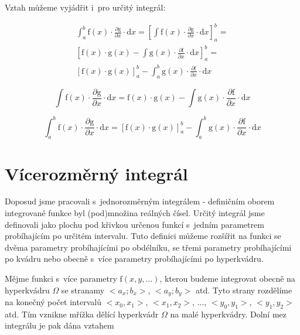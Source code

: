 Vztah můžeme vyjádřit i~pro určitý integrál:

\begin{equation}
\begin{split}
\int_a^b \mathrm{f}(x) \cdot \frac{\partial \mathrm{g}}{\partial x} \cdot \mathrm{d}x = \left[ \int \mathrm{f}(x) \cdot \frac{\partial \mathrm{g}}{\partial x} \cdot \mathrm{d}x \right]_a^b = \\
\left[ \mathrm{f}(x) \cdot \mathrm{g}(x) - \int \mathrm{g}(x) \cdot \frac{\partial \mathrm{f}}{\partial x} \cdot \mathrm{d}x \right]_a^b = \\
\left[ \mathrm{f}(x) \cdot \mathrm{g}(x) \right]_a^b - \int_a^b \mathrm{g}(x) \cdot \frac{\partial \mathrm{f}}{\partial x} \cdot \mathrm{d}x
\end{split}
\end{equation}

\begin{fact}
\begin{equation}
\int \mathrm{f}(x) \cdot \frac{\partial \mathrm{g}}{\partial x} \cdot \mathrm{d}x = \mathrm{f}(x) \cdot \mathrm{g}(x) - \int \mathrm{g}(x) \cdot \frac{\partial \mathrm{f}}{\partial x} \cdot \mathrm{d}x
\end{equation}

\begin{equation}
\int_a^b \mathrm{f}(x) \cdot \frac{\partial \mathrm{g}}{\partial x} \cdot \mathrm{d}x =
\left[ \mathrm{f}(x) \cdot \mathrm{g}(x) \right]_a^b - \int_a^b \mathrm{g}(x) \cdot \frac{\partial \mathrm{f}}{\partial x} \cdot \mathrm{d}x
\end{equation}
\end{fact}

\section{Vícerozměrný integrál}

Doposud jsme pracovali s~jednorozměrným integrálem - definičním oborem integrované funkce byl (pod)množina reálných čísel. Určitý integrál jsme definovali jako plochu pod křivkou určenou funkcí s~jedním parametrem probíhajícím po určitém intervalu. Tuto definici můžeme rozšířit na funkci se dvěma parametry probíhajícími po obdélníku, se třemi parametry probíhajícími po kvádru nebo obecně s~více parametry probíhajícími po hyperkvádru.

Mějme funkci s~více parametry \(\mathrm{f}(x, y, ...)\), kterou budeme integrovat obecně na hyperkvádru \(\Omega\) se stranamy \(<a_x; b_x>\), \(<a_y; b_y>\) atd. Tyto strany rozdělíme na konečný počet intervalů \(<x_0, x_1>\), \(<x_1, x_2>\), ...,  \(<y_0, y_1>\), \(<y_1, y_2>\) atd. Tím vznikne mřížka dělící hyperkvádr \(\Omega\) na malé hyperkvádry. Dolní mez integrálu je pak dána vztahem

